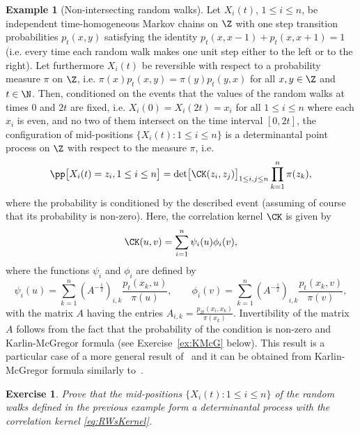 \documentclass[]{pcmi}
\theoremstyle{plain}
\newtheorem{exercise}[equation]{Exercise}
\theoremstyle{definition}
\newtheorem{example}[equation]{Example}
\begin{document}
\begin{example}[Non-intersecting random walks]\label{ex:RWs}
Let $X_i(t)$, $1 \leq i \leq n$, be independent time-homogeneous Markov chains on $\Z$ with one step transition probabilities $p_t(x,y)$ satisfying the identity \break$p_t(x,x-1) + p_t(x,x+1) = 1$ (i.e. every time each random walk makes one unit step either to the left or to the right). Let furthermore $X_i(t)$ be reversible with respect to a probability measure $\pi$ on $\Z$, i.e. $\pi(x) p_t(x,y) = \pi(y) p_t(y, x)$ for all $x, y \in \Z$ and $t \in \N$. Then, conditioned on the events that the values of the random walks at times $0$ and $2t$ are fixed, i.e. $X_i(0) = X_i(2t) = x_i$ for all $1 \leq i \leq n$ where each $x_i$ is even, and no two of them intersect on the time interval $[0, 2t]$, the configuration of mid-positions $\{X_i(t) : 1 \leq i \leq n\}$ is a determinantal point process on $\Z$ with respect to the measure $\pi$, i.e.
\begin{equation}\label{eq:RWs}
\pp\bigl[ X_i(t) = z_i, 1 \leq i \leq n \bigr] = \det \bigl[\CK(z_i,z_j)\bigr]_{1 \leq i,j \leq n} \prod_{k=1}^n \pi(z_k),
\end{equation}
where the probability is conditioned by the described event (assuming of course that its probability is non-zero). Here, the correlation kernel $\CK$ is given by
\begin{equation}\label{eq:RWsKernel}
\CK(u, v) = \sum_{i=1}^n \psi_i(u) \phi_i(v),
\end{equation}
where the functions $\psi_i$ and $\phi_i$ are defined by
\[
\psi_i(u) = \sum_{k=1}^n \left(A^{-\frac{1}{2}}\right)_{i, k} \frac{p_t(x_k, u)}{\pi(u)}, \qquad \phi_i(v) = \sum_{k=1}^n \left(A^{-\frac{1}{2}}\right)_{i, k} \frac{p_t(x_k, v)}{\pi(v)},
\]
with the matrix $A$ having the entries $A_{i, k} = \frac{p_{2t}(x_i, x_k)}{\pi(x_k)}$. Invertibility of the matrix $A$ follows from the fact that the probability of the condition is non-zero and Karlin-McGregor formula (see Exercise~\ref{ex:KMcG} below). This result is a particular case of a more general result of~\cite{johansson} and it can be obtained from Karlin-McGregor formula similarly to~\cite[Cor.~4.3.3]{BHKPV}.
\end{example}

\begin{exercise}
Prove that the mid-positions $\{X_i(t) : 1 \leq i \leq n\}$ of the random walks defined in the previous example form a determinantal process with the correlation kernel \eqref{eq:RWsKernel}.
\end{exercise}
\end{document}
